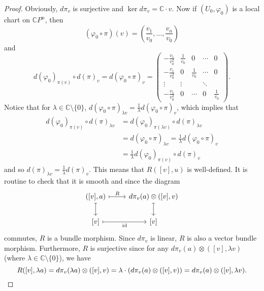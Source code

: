 \documentclass[10pt, a4paper]{article}
\newenvironment{noticeC}{%
  \tcolorbox[%
  notitle,
  empty,
  enhanced,  %
  breakable,
  coltext=black, 
  fontupper=\rmfamily,
  noparskip,
  sharp corners,
  boxrule=-1pt,  %
  frame hidden,
  left=7pt,  %
  right=7pt,
  top=5pt,
  bottom=5pt,
  before skip=2.5ex plus 2pt,
  after skip=2.5ex plus 2pt,
  overlay unbroken and last={%
  },
  ]}
{\endtcolorbox}
\newenvironment{myproof}%
  {\begin{noticeC}\begin{proof}}%
  {\end{proof}\end{noticeC}}
\newcommand{\C}{\mathbb {C}}
\DeclareMathOperator{\id}{id}
\begin{document}
\begin{myproof}
  Obviously, $d \pi_v$ is surjective and $\ker d\pi_v = \C \cdot v$.
  Now if $(U_0, \varphi_0)$ is a local chart on $\C P^n$, then 
  $$(\varphi_0 \circ \pi) (v) = \left(\frac{v_1}{v_0}, \dots, \frac{v_n}{v_0}\right)$$
  and $$d(\varphi_0)_{\pi(v)} \circ d(\pi)_v = d(\varphi_0 \circ \pi)_v = \begin{pmatrix}
    -\frac{v_1}{v_0^2} & \frac{1}{v_0} & 0 & \cdots & 0\\
    -\frac{v_1}{v_0^2} & 0 &\frac{1}{v_0} & \cdots & 0\\
    \vdots & \vdots & & \ddots & \\
    -\frac{v_1}{v_0^2} & 0 & \cdots & 0 & \frac{1}{v_0}
  \end{pmatrix}.$$
  Notice that for $\lambda \in \C \setminus \{0\}$, $d(\varphi_0 \circ \pi)_{\lambda v} = \frac{1}{\lambda} d(\varphi_0 \circ \pi)_{v}$, which implies that 
  \begin{align*}
    d(\varphi_0)_{\pi(v)} \circ d(\pi)_{\lambda v} &= d(\varphi_0)_{\pi( \lambda v)} \circ d(\pi)_{\lambda v}\\ 
    &= d(\varphi_0 \circ \pi)_{\lambda v} = \frac{1}{\lambda} d(\varphi_0 \circ \pi)_v \\
    &= \frac{1}{\lambda} d(\varphi_0)_{\pi(v)} \circ d(\pi)_v
  \end{align*}
  and so $d(\pi)_{\lambda v} = \frac{1}{\lambda} d(\pi)_{v}$. This means that $R([v], u)$ is well-defined.
  It is routine to check that it is smooth and since the diagram 
\[\begin{tikzcd}
	{([v], a)} & {d \pi_v (a) \otimes ([v], v)} \\
	{[v]} & {[v]}
	\arrow["R", maps to, from=1-1, to=1-2]
	\arrow[maps to, from=1-1, to=2-1]
	\arrow[maps to, from=1-2, to=2-2]
	\arrow["\id"', maps to, from=2-1, to=2-2]
\end{tikzcd}\]
  commutes, $R$ is a bundle morphism. Since $d\pi_v$ is linear, $R$ is also a vector bundle morphism.
  Furthermore, $R$ is surjective since for any $d \pi_v (a) \otimes ([v], \lambda v)$ (where $\lambda \in \C \setminus \{0\}$), we have
  \begin{equation*}
    R([v], \lambda a) = d \pi_v (\lambda a) \otimes ([v], v) = \lambda \cdot (d \pi_v (a) \otimes ([v], v)) = d \pi_v (a) \otimes ([v], \lambda v). \qedhere
  \end{equation*}
\end{myproof}
\end{document}
